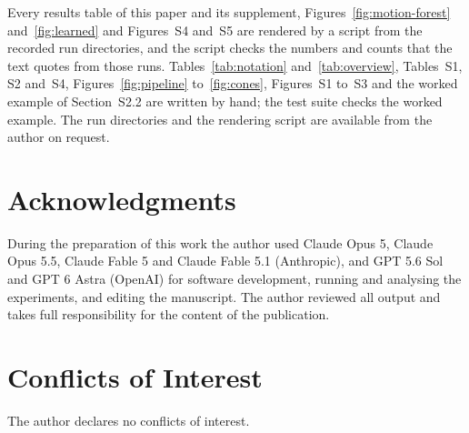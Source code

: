 \documentclass[12pt]{article}
\begin{document}
Every results table of this paper and its supplement, Figures~\ref{fig:motion-forest} and~\ref{fig:learned} and Figures~S4 and~S5 are rendered by a script from the recorded run directories, and the script checks the numbers and counts that the text quotes from those runs. Tables~\ref{tab:notation} and~\ref{tab:overview}, Tables~S1, S2 and~S4, Figures~\ref{fig:pipeline} to~\ref{fig:cones}, Figures~S1 to~S3 and the worked example of Section~S2.2 are written by hand; the test suite checks the worked example. The run directories and the rendering script are available from the author on request.

\section*{Acknowledgments}
During the preparation of this work the author used Claude Opus 5, Claude Opus 5.5, Claude Fable 5 and Claude Fable 5.1 (Anthropic), and GPT 5.6 Sol and GPT 6 Astra (OpenAI) for software development, running and analysing the experiments, and editing the manuscript. The author reviewed all output and takes full responsibility for the content of the publication.

\section*{Conflicts of Interest}
The author declares no conflicts of interest.



\end{document}
